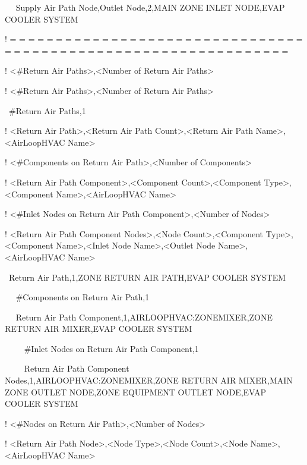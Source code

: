 ~~ Supply Air Path Node,Outlet Node,2,MAIN ZONE INLET NODE,EVAP COOLER SYSTEM

! = = = = = = = = = = = = = = = = = = = = = = = = = = = = = = = = = = = = = = = = = = = = = = = = = = = = = = = = = = = = = = =

! \textless{}\#Return Air Paths\textgreater{},\textless{}Number of Return Air Paths\textgreater{}

! \textless{}\#Return Air Paths\textgreater{},\textless{}Number of Return Air Paths\textgreater{}

~\#Return Air Paths,1

! \textless{}Return Air Path\textgreater{},\textless{}Return Air Path Count\textgreater{},\textless{}Return Air Path Name\textgreater{},\textless{}AirLoopHVAC Name\textgreater{}

! \textless{}\#Components on Return Air Path\textgreater{},\textless{}Number of Components\textgreater{}

! \textless{}Return Air Path Component\textgreater{},\textless{}Component Count\textgreater{},\textless{}Component Type\textgreater{},\textless{}Component Name\textgreater{},\textless{}AirLoopHVAC Name\textgreater{}

! \textless{}\#Inlet Nodes on Return Air Path Component\textgreater{},\textless{}Number of Nodes\textgreater{}

! \textless{}Return Air Path Component Nodes\textgreater{},\textless{}Node Count\textgreater{},\textless{}Component Type\textgreater{},\textless{}Component Name\textgreater{},\textless{}Inlet Node Name\textgreater{},\textless{}Outlet Node Name\textgreater{},\textless{}AirLoopHVAC Name\textgreater{}

~Return Air Path,1,ZONE RETURN AIR PATH,EVAP COOLER SYSTEM

~~ \#Components on Return Air Path,1

~~ Return Air Path Component,1,AIRLOOPHVAC:ZONEMIXER,ZONE RETURN AIR MIXER,EVAP COOLER SYSTEM

~~~~ \#Inlet Nodes on Return Air Path Component,1

~~~~ Return Air Path Component Nodes,1,AIRLOOPHVAC:ZONEMIXER,ZONE RETURN AIR MIXER,MAIN ZONE OUTLET NODE,ZONE EQUIPMENT OUTLET NODE,EVAP COOLER SYSTEM

! \textless{}\#Nodes on Return Air Path\textgreater{},\textless{}Number of Nodes\textgreater{}

! \textless{}Return Air Path Node\textgreater{},\textless{}Node Type\textgreater{},\textless{}Node Count\textgreater{},\textless{}Node Name\textgreater{},\textless{}AirLoopHVAC Name\textgreater{}

